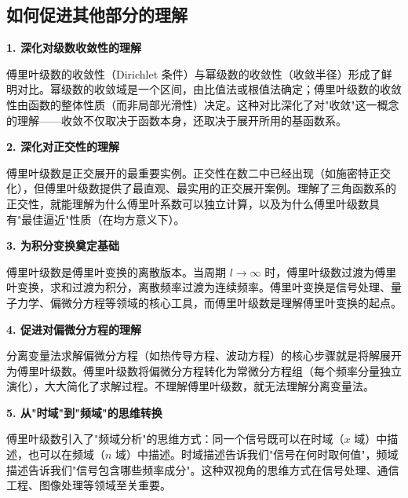\subsection{如何促进其他部分的理解}

\begin{connectionbox}
\textbf{1. 深化对级数收敛性的理解}

傅里叶级数的收敛性（Dirichlet 条件）与幂级数的收敛性（收敛半径）形成了鲜明对比。幂级数的收敛域是一个区间，由比值法或根值法确定；傅里叶级数的收敛性由函数的整体性质（而非局部光滑性）决定。这种对比深化了对"收敛"这一概念的理解——收敛不仅取决于函数本身，还取决于展开所用的基函数系。

\textbf{2. 深化对正交性的理解}

傅里叶级数是正交展开的最重要实例。正交性在数二中已经出现（如施密特正交化），但傅里叶级数提供了最直观、最实用的正交展开案例。理解了三角函数系的正交性，就能理解为什么傅里叶系数可以独立计算，以及为什么傅里叶级数具有"最佳逼近"性质（在均方意义下）。

\textbf{3. 为积分变换奠定基础}

傅里叶级数是傅里叶变换的离散版本。当周期 $l\to\infty$ 时，傅里叶级数过渡为傅里叶变换，求和过渡为积分，离散频率过渡为连续频率。傅里叶变换是信号处理、量子力学、偏微分方程等领域的核心工具，而傅里叶级数是理解傅里叶变换的起点。

\textbf{4. 促进对偏微分方程的理解}

分离变量法求解偏微分方程（如热传导方程、波动方程）的核心步骤就是将解展开为傅里叶级数。傅里叶级数将偏微分方程转化为常微分方程组（每个频率分量独立演化），大大简化了求解过程。不理解傅里叶级数，就无法理解分离变量法。

\textbf{5. 从"时域"到"频域"的思维转换}

傅里叶级数引入了"频域分析"的思维方式：同一个信号既可以在时域（$x$ 域）中描述，也可以在频域（$n$ 域）中描述。时域描述告诉我们"信号在何时取何值"，频域描述告诉我们"信号包含哪些频率成分"。这种双视角的思维方式在信号处理、通信工程、图像处理等领域至关重要。
\end{connectionbox}
